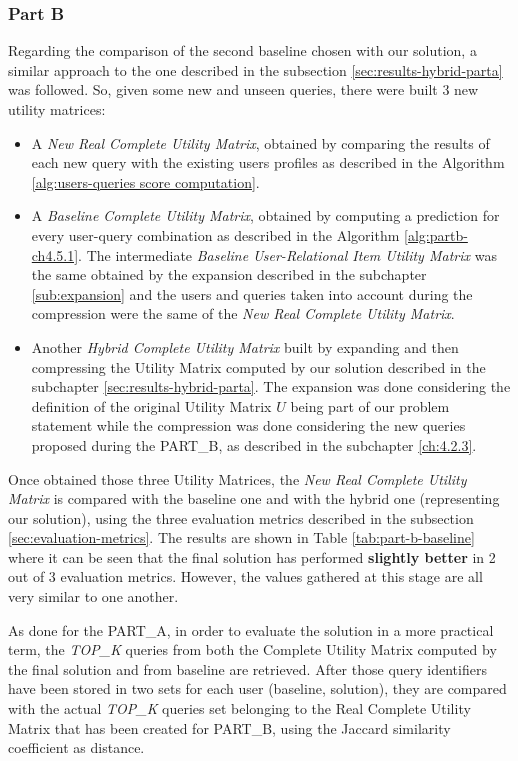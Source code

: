 \subsubsection{Part B} \label{ch:5.7.2}
Regarding the comparison of the second baseline chosen with our solution, a similar approach to the one described in the subsection \ref{sec:results-hybrid-parta} was followed. So, given some new and unseen queries, there were built 3 new utility matrices:
\begin{itemize}
    \item A \textit{New Real Complete Utility Matrix}, obtained by comparing the results of each new query with the existing users profiles as described in the Algorithm \ref{alg:users-queries score computation}.
    \item A \textit{Baseline Complete Utility Matrix}, obtained by computing a prediction for every user-query combination as described in the Algorithm \ref{alg:partb-ch4.5.1}. The intermediate \textit{Baseline User-Relational Item Utility Matrix} was the same obtained by the expansion described in the subchapter \ref{sub:expansion}  and the users and queries taken into account during the compression were the same of the \textit{New Real Complete Utility Matrix}.
    \item Another \textit{Hybrid Complete Utility Matrix} built by expanding and then compressing the Utility Matrix computed by our solution described in the subchapter \ref{sec:results-hybrid-parta}. The expansion was done considering the definition of the original Utility Matrix $U$ being part of our problem statement while the compression was done considering the new queries proposed during the PART\_B, as described in the subchapter \ref{ch:4.2.3}.
\end{itemize}

Once obtained those three Utility Matrices, the \textit{New Real Complete Utility Matrix} is compared with the baseline one and with the hybrid one (representing our solution), using the three evaluation metrics described in the subsection \ref{sec:evaluation-metrics}. The results are shown in Table \ref{tab:part-b-baseline} where it can be seen that the final solution has performed \textbf{slightly better} in 2 out of 3 evaluation metrics. However, the values gathered at this stage are all very similar to one another.



As done for the PART\_A, in order to evaluate the solution in a more practical term, the \textit{TOP\_K} queries from both the Complete Utility Matrix computed by the final solution and from baseline are retrieved. After those query identifiers have been stored in two sets for each user (baseline, solution), they are compared with the actual \textit{TOP\_K} queries set belonging to the Real Complete Utility Matrix that has been created for PART\_B, using the Jaccard similarity coefficient as distance.

